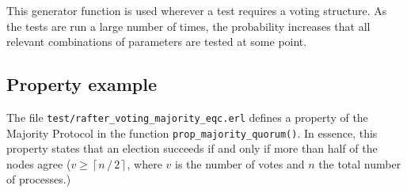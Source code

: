 \documentclass[11pt,chapterprefix=true,toc=bibliography,numbers=noendperiod,
               footnotes=multiple,twoside]{scrreprt}
\begin{document}
This generator function is used wherever a test requires a voting structure. As the tests are run a large number of times, the probability increases that all relevant combinations of parameters are tested at some point.

\subsection{Property example\label{ssc:property}}

The file \texttt{test/rafter\_voting\_majority\_eqc.erl} defines a property of the Majority Protocol in the function \texttt{prop\_majority\_quorum()}. In essence, this property states that an election succeeds if and only if more than half of the nodes agree (\(v \ge \left\lceil n \, / \, 2 \right\rceil \), where \(v\) is the number of votes and \(n\) the total number of processes.)


%
%

\end{document}

